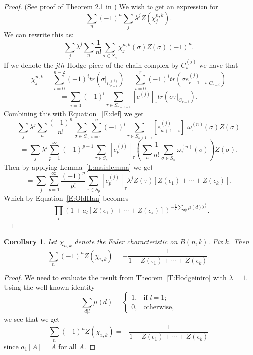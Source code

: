 \documentclass{amsart}
\newtheorem{corollary}[theorem]{Corollary}
\begin{document}
\begin{proof} (See proof of Theorem 2.1 in \cite{Hanlon})
  We wish to get an expression for $$\sum_n (-1)^n \sum_j \lambda^j Z(\chi_j^{n, k}).$$ We can rewrite this as: 
  \begin{equation} \label{E:def}
    \sum_j \lambda^j \sum_n \frac{1}{n!} \sum_{\sigma \in S_n} \chi_j^{n, k}(\sigma)Z(\sigma) (-1)^n. 
  \end{equation}
  If we denote the $jth$ Hodge piece of the chain complex by $C_*^{(j)}$ we have that
  $$\chi_j^{n, k} = \sum_{i=0}^{n-2} (-1)^i tr(\sigma|_{C_{r-i}^{(j)}}) = \sum_{i=0}^r (-1)^i tr(\sigma e_{r+1-i}^{(j)}
  |_{C_{r-i}})$$ $$= \sum_{i=0} (-1)^i \sum_{\tau \in S_{r+1-i}} [e^{(j)}]_\tau tr(\sigma\tau|_{C_{r-i}}).$$ Combining this 
  with Equation ~\ref{E:def} we get $$\sum_j \lambda^j \sum_n \frac{(-1)^n}{n!} \sum_{\sigma \in S_n}
  \sum_{i=0}^n (-1)^i \sum_{\tau \in S_{n+1-i}} [e^{(j)}_{n+1-i}]_\tau \omega_\tau^{(n)}(\sigma) Z(\sigma)$$
  $$ = \sum_j \lambda^j \sum_{p=1}^\infty (-1)^{p+1} \sum_{\tau \in S_p} [e_p^{(j)}]_\tau (\sum_n \frac{1}{n!} \sum_{\sigma
  \in S_n} \omega_\tau^{(n)}(\sigma)) Z(\sigma).$$ Then by applying Lemma~\ref{L:mainlemma} we get 
  $$=\sum_j \sum_{p=1}^\infty \frac{(-1)^p}{p!} \sum_{\tau \in S_p} [e_p^{(j)}]_\tau \lambda^j Z(\tau)[Z(\epsilon_1) + 
  \cdots + Z(\epsilon_k)].$$ Which by Equation~\ref{E:OldHan} becomes $$-\prod_l (1+ a_l[Z(\epsilon_1) + \cdots + 
  Z(\epsilon_k)])^{- \frac{1}{l} \sum_{d | l} \mu(d) \lambda^\frac{l}{d}}.$$
\end{proof}

  

 \begin{corollary} Let $\chi_{n, k}$ denote the Euler characteristic on $B(n, k)$. Fix $k$. Then 
   \begin{equation} \label{E:Euler}
        \sum_n (-1)^n Z(\chi_{n, k}) = -\frac{1}{1 + Z(\epsilon_1) + \cdots + Z(\epsilon_k)}.
   \end{equation}
\end{corollary}
\begin{proof}
   We need to evaluate the result from Theorem~\ref{T:Hodgeintro} with $\lambda = 1$. Using the well-known identity
   \begin{equation} \sum_{d|l} \mu(d) =   \begin{cases} 
   1, &\text{if $l=1$;}\\
   0, &\text{otherwise,}
  \end{cases}
  \end{equation} we see that we get $$\sum_n (-1)^n Z(\chi_{n, k}) =- \frac{1}{1+Z(\epsilon_1)+\cdots +Z(\epsilon_k)}$$ 
  since $a_1[A]=A$ for all $A$.
\end{proof}
\end{document}
